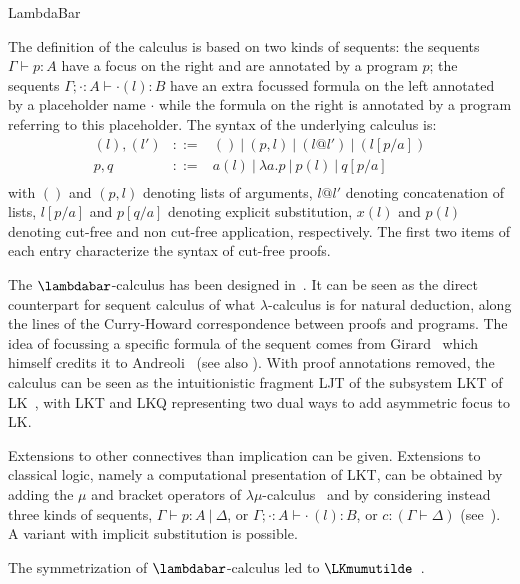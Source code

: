 \begin{entry}{LambdaBar}
\begin{clarifications}
The definition of the calculus is based on two kinds of sequents: the
sequents $\Gamma \vdash p:A$ have a focus on the right and are
annotated by a program $p$; the sequents
$\Gamma; \cdot:A \vdash \cdot(l):B$ have an extra focussed formula on
the left annotated by a placeholder name $\cdot$ while the formula on
the right is annotated by a program referring to this placeholder.
The syntax of the underlying calculus is:
$$
\begin{array}{lll}
(l),(l') & ::= & () ~|~ (p,l) ~|~ (l@l') ~|~ (l[p/a])\\
p,q & ::= & a(l) ~|~ \lambda a.p ~|~ p(l) ~|~ q[p/a]\\
\end{array}
$$
with $()$ and $(p,l)$ denoting lists of arguments, $l@l'$ denoting
concatenation of lists, $l[p/a]$ and $p[q/a]$ denoting explicit
substitution, $x(l)$ and $p(l)$ denoting cut-free and non cut-free
application, respectively. The first two items of each entry
characterize the syntax of cut-free proofs.
\end{clarifications}

\begin{history}
The $\lambdabar$-calculus has been designed
in~\cite{Herbelin94,HerbelinPhD}. It can be seen as the direct counterpart
for sequent calculus of what $\lambda$-calculus is for natural
deduction, along the lines of the Curry-Howard correspondence between
proofs and programs. The idea of focussing a specific formula of the
sequent comes from Girard~\cite{girard91mscs} which himself credits it to
Andreoli~\cite{andreoli92jlc} (see also ). With proof
annotations removed, the calculus can be seen as the intuitionistic
fragment LJT of the subsystem LKT of LK~\cite{danos93wll}, with LKT and
LKQ representing two dual ways to add asymmetric focus to LK.

Extensions to other connectives than implication can be given.
Extensions to classical logic, namely a computational presentation of
LKT, can be obtained by adding the $\mu$ and bracket operators of
$\lambda\mu$-calculus~ and by considering instead three
kinds of sequents, $\Gamma \vdash p:A ~|~ \Delta$, or
$\Gamma; \cdot:A \vdash \cdot\,(l):B$, or $c: (\Gamma \vdash \Delta)$
(see~\cite{HerbelinPhD}). A variant with implicit substitution is
possible.

The symmetrization of $\lambdabar$-calculus led to
$\LKmumutilde$~.
\end{history}




\end{entry}
